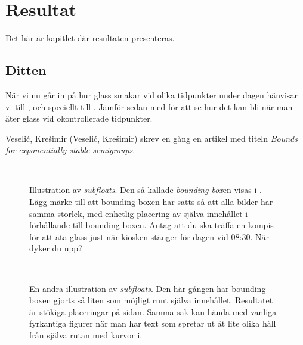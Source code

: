 \chapter{Resultat}\label{cha:Research}
%
Det här är kapitlet där resultaten presenteras.


\section{Ditten}\label{sec:research:history}
%



När vi nu går in på hur glass smakar vid olika tidpunkter under dagen hänvisar vi till , och speciellt till .  Jämför sedan med  för att se hur det kan bli när man äter glass vid okontrollerade tidpunkter.

Veselić, Krešimir (Veseli\'{c}, Kre\v{s}imir) skrev en gång en artikel med titeln \emph{Bounds for exponentially stable semigroups}.

\begin{figure}[tbp]
  \centering
  \qquad
  \\
  \qquad
  \caption{\label{fig:times}%
    Illustration av \emph{subfloats}.  Den så kallade \emph{bounding box}en visas i \protect{}.  Lägg märke till att bounding boxen har satts så att alla bilder har samma storlek, med enhetlig placering av själva innehållet i förhållande till bounding boxen.  Antag att du ska träffa en kompis för att äta glass just när kiosken stänger för dagen vid 08:30.  När dyker du upp?}
\end{figure}

\begin{figure}[tbp]
  \centering
  \qquad
  \\
  \qquad
  \caption{\label{fig:times2}%
    En andra illustration av \emph{subfloats}.  Den här gången har bounding boxen gjorts så liten som möjligt runt själva innehållet.  Resultatet är stökiga placeringar på sidan.  Samma sak kan hända med vanliga fyrkantiga figurer när man har text som spretar ut åt lite olika håll från själva rutan med kurvor i.}
\end{figure}

